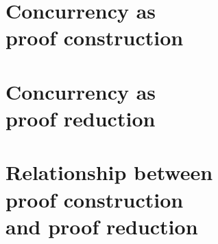 \documentclass[
  tufte-book,
  notoc,
  symmetric,
  biblatex={
    citestyle=authoryear-comp,
    autocite=footnote,
    maxcitenames=2,
    bibstyle=authoryear,
    dashed=false,
    mergedate=basic,
    maxbibnames=99,
    backref=true,
    doi=false,
    url=false,
    isbn=false,
  }
]{tufte-thesis}
\begin{document}
 \part[Concurrency as proof construction]{Concurrency as\\proof construction}\label{part:proof-construction}



% 

% 


\part[Concurrency as proof reduction]{Concurrency as\\proof reduction}\label{part:proof-reduction}




\part[Relationship between proof construction and reduction]{Relationship between\\proof construction\\and proof reduction}\label{part:comparison}




\appendix



\backmatter

\printbibliography
\end{document}
